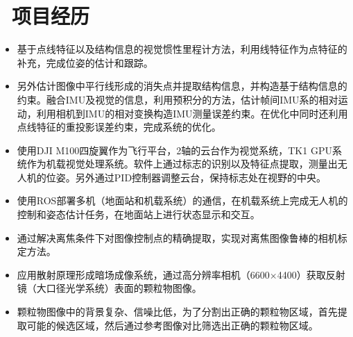 \documentclass{resume}
\begin{document}
\section{\faUsers\ 项目经历}
\begin{itemize}\small
  \item 基于点线特征以及结构信息的视觉惯性里程计方法，利用线特征作为点特征的补充，完成位姿的估计和跟踪。
  \item 另外估计图像中平行线形成的消失点并提取结构信息，并构造基于结构信息的约束。融合IMU及视觉的信息，利用预积分的方法，估计帧间IMU系的相对运动，利用相机到IMU的相对变换构造IMU测量误差约束。在优化中同时还利用点线特征的重投影误差约束，完成系统的优化。
\end{itemize}

\begin{itemize}\small
  \item 使用DJI M100四旋翼作为飞行平台，2轴的云台作为视觉系统，TK1 GPU系统作为机载视觉处理系统。软件上通过标志的识别以及特征点提取，测量出无人机的位姿。另外通过PID控制器调整云台，保持标志处在视野的中央。
  \item 使用ROS部署多机（地面站和机载系统）的通信，在机载系统上完成无人机的控制和姿态估计任务，在地面站上进行状态显示和交互。
  \item 通过解决离焦条件下对图像控制点的精确提取，实现对离焦图像鲁棒的相机标定方法。
\end{itemize}

\begin{itemize}\small
\item 应用散射原理形成暗场成像系统，通过高分辨率相机（6600$\times$4400）获取反射镜（大口径光学系统）表面的颗粒物图像。
\item 颗粒物图像中的背景复杂、信噪比低，为了分割出正确的颗粒物区域，首先提取可能的候选区域，然后通过参考图像对比筛选出正确的颗粒物区域。
\end{itemize}
\end{document}
